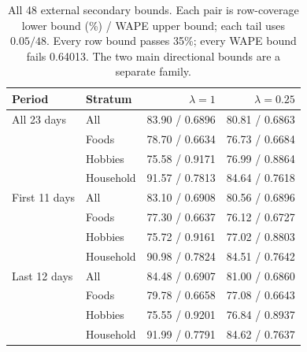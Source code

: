 \begin{table}[t]
\centering\small
\caption{All 48 external secondary bounds. Each pair is row-coverage lower bound (\%) / WAPE upper bound; each tail uses $0.05/48$. Every row bound passes 35\%; every WAPE bound fails 0.64013. The two main directional bounds are a separate family.}
\label{tab:external-bounds}
\begin{tabular}{llrr}
\toprule
Period & Stratum & $\lambda=1$ & $\lambda=0.25$\\
\midrule
All 23 days & All & 83.90 / 0.6896 & 80.81 / 0.6863 \\
 & Foods & 78.70 / 0.6634 & 76.73 / 0.6684 \\
 & Hobbies & 75.58 / 0.9171 & 76.99 / 0.8864 \\
 & Household & 91.57 / 0.7813 & 84.64 / 0.7618 \\
First 11 days & All & 83.10 / 0.6908 & 80.56 / 0.6896 \\
 & Foods & 77.30 / 0.6637 & 76.12 / 0.6727 \\
 & Hobbies & 75.72 / 0.9161 & 77.02 / 0.8803 \\
 & Household & 90.98 / 0.7824 & 84.51 / 0.7642 \\
Last 12 days & All & 84.48 / 0.6907 & 81.00 / 0.6860 \\
 & Foods & 79.78 / 0.6658 & 77.08 / 0.6643 \\
 & Hobbies & 75.55 / 0.9201 & 76.84 / 0.8937 \\
 & Household & 91.99 / 0.7791 & 84.62 / 0.7637 \\
\bottomrule
\end{tabular}
\end{table}
